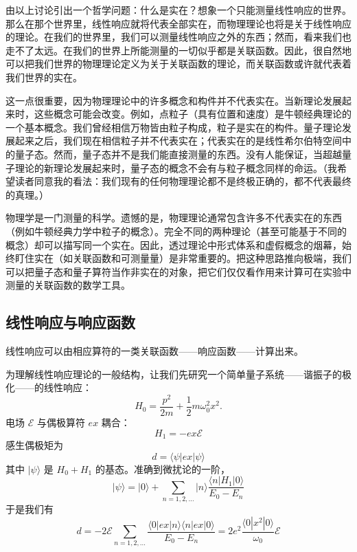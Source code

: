 由以上讨论引出一个哲学问题：什么是实在？想象一个只能测量线性响应的世界。那么在那个世界里，线性响应就将代表全部实在，而物理理论也将是关于线性响应的理论。在我们的世界里，我们可以测量线性响应之外的东西；然而，看来我们也走不了太远。在我们的世界上所能测量的一切似乎都是关联函数。因此，很自然地可以把我们世界的物理理论定义为关于关联函数的理论，而关联函数或许就代表着我们世界的实在。

这一点很重要，因为物理理论中的许多概念和构件并不代表实在。当新理论发展起来时，这些概念可能会改变。例如，点粒子（具有位置和速度）是牛顿经典理论的一个基本概念。我们曾经相信万物皆由粒子构成，粒子是实在的构件。量子理论发展起来之后，我们现在相信粒子并不代表实在；代表实在的是线性希尔伯特空间中的量子态。然而，量子态并不是我们能直接测量的东西。没有人能保证，当超越量子理论的新理论发展起来时，量子态的概念不会有与粒子概念同样的命运。（我希望读者同意我的看法：我们现有的任何物理理论都不是终极正确的，都不代表最终的真理。）

物理学是一门测量的科学。遗憾的是，物理理论通常包含许多不代表实在的东西（例如牛顿经典力学中粒子的概念）。完全不同的两种理论（甚至可能基于不同的概念）却可以描写同一个实在。因此，透过理论中形式体系和虚假概念的烟幕，始终盯住实在（如关联函数和可测量量）是非常重要的。把这种思路推向极端，我们可以把量子态和量子算符当作非实在的对象，把它们仅仅看作用来计算可在实验中测量的关联函数的数学工具。

\subsection{线性响应与响应函数}

\begin{keypoints}
\item 线性响应可以由相应算符的一类关联函数——响应函数——计算出来。
\end{keypoints}

为理解线性响应理论的一般结构，让我们先研究一个简单量子系统——谐振子的极化——的线性响应：
\begin{equation*}
H_0=\frac{p^2}{2m}+\frac{1}{2}m\omega_0^2x^2.
\end{equation*}
电场 $\mathcal{E}$ 与偶极算符 $ex$ 耦合：
\begin{equation*}
H_1=-ex\mathcal{E}
\end{equation*}
感生偶极矩为
\begin{equation*}
d=\langle\psi|ex|\psi\rangle
\end{equation*}
其中 $|\psi\rangle$ 是 $H_0+H_1$ 的基态。准确到微扰论的一阶，
\begin{equation*}
|\psi\rangle=|0\rangle+\sum_{n=1,2,\dots}|n\rangle\frac{\langle n|H_1|0\rangle}{E_0-E_n}
\end{equation*}
于是我们有
\begin{equation*}
d=-2\mathcal{E}\sum_{n=1,2,\dots}\frac{\langle 0|ex|n\rangle\langle n|ex|0\rangle}{E_0-E_n}=2e^2\frac{\langle 0|x^2|0\rangle}{\omega_0}\mathcal{E}\tag{2.2.1}
\end{equation*}

